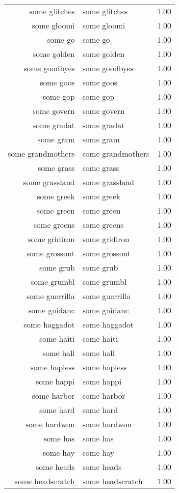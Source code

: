 \begin{table}[ht]
\begin{tabular}{rlr}
  some glitches & some glitches & 1.00 \\ 
  some gloomi & some gloomi & 1.00 \\ 
  some go & some go & 1.00 \\ 
  some golden & some golden & 1.00 \\ 
  some goodbyes & some goodbyes & 1.00 \\ 
  some goos & some goos & 1.00 \\ 
  some gop & some gop & 1.00 \\ 
  some govern & some govern & 1.00 \\ 
  some gradat & some gradat & 1.00 \\ 
  some gram & some gram & 1.00 \\ 
  some grandmothers & some grandmothers & 1.00 \\ 
  some grass & some grass & 1.00 \\ 
  some grassland & some grassland & 1.00 \\ 
  some greek & some greek & 1.00 \\ 
  some green & some green & 1.00 \\ 
  some greens & some greens & 1.00 \\ 
  some gridiron & some gridiron & 1.00 \\ 
  some grossout & some grossout & 1.00 \\ 
  some grub & some grub & 1.00 \\ 
  some grumbl & some grumbl & 1.00 \\ 
  some guerrilla & some guerrilla & 1.00 \\ 
  some guidanc & some guidanc & 1.00 \\ 
  some haggadot & some haggadot & 1.00 \\ 
  some haiti & some haiti & 1.00 \\ 
  some hall & some hall & 1.00 \\ 
  some hapless & some hapless & 1.00 \\ 
  some happi & some happi & 1.00 \\ 
  some harbor & some harbor & 1.00 \\ 
  some hard & some hard & 1.00 \\ 
  some hardwon & some hardwon & 1.00 \\ 
  some has & some has & 1.00 \\ 
  some hay & some hay & 1.00 \\ 
  some heads & some heads & 1.00 \\ 
  some headscratch & some headscratch & 1.00 \\ 

\end{tabular}
\end{table}
